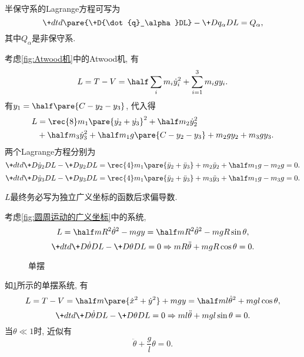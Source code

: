 \documentclass[../LectureNotes.tex]{subfiles}
\begin{document}
\begin{remark}
    半保守系的Lagrange方程可写为
    \[ \+dtd{}\pare{\+D{\dot{q}_\alpha}DL} - \+D{q_\alpha}D{L} = Q_\alpha, \]
    其中$Q_\alpha$是非保守系.
\end{remark}
\begin{sample}
    \begin{ex}
        考虑\cref{fig:Atwood机}中的Atwood机, 有
        \[ L = T-V = \half\sum_i m_i \dot{y}_i^2 + \sum_{i=1}^3 m_i gy_i. \]
        有$\displaystyle y_1 = \half\pare{C - y_2 - y_3}$, 代入得
        \begin{align*}
            L &= \rec{8}m_1\pare{\dot{y_2}+\dot{y_3}}^2 + \half m_2\dot{y}_2^2 \\ &+ \half m_3\dot{y}_3^2 + \half m_1g\pare{C-y_2 - y_3} + m_2 gy_2 + m_3gy_3. 
        \end{align*}
        两个Lagrange方程分别为
        \[ \+dtd{}\+D{\dot{y}_2}DL - \+D{y_2}DL = \rec{4}m_1\pare{\ddot{y}_2 + \ddot{y}_3} + m_2\ddot{y}_2 + \half m_1 g - m_2 g = 0. \]
        \[ \+dtd{}\+D{\dot{y}_3}DL - \+D{y_3}DL = \rec{4}m_1\pare{\ddot{y}_2 + \ddot{y}_3} + m_3\ddot{y}_3 + \half m_1 g - m_3 g = 0. \]
    \end{ex}
\end{sample}
\begin{pitfall}
    $L$最终务必写为独立广义坐标的函数后求偏导数.
\end{pitfall}
\begin{sample}
    \begin{ex}
        考虑\cref{fig:圆周运动的广义坐标}中的系统,
        \[ L = \half mR^2\dot{\theta}^2 - mgy = \half mR^2\dot{\theta}^2 - mgR\sin\theta, \]
        \[ \+dtd{}\+D{\dot{\theta}}DL - \+D{\theta}DL = 0\Rightarrow mR\ddot{\theta} + mgR\cos\theta = 0. \]
    \end{ex}
\end{sample}
\begin{figure}[ht]
    \centering
    \caption{单摆}
    \label{fig:单摆}
\end{figure}
\begin{sample}
    \begin{ex}
        如\cref{fig:单摆}所示的单摆系统, 有
        \[ L = T-V = \half m\pare{\dot{x}^2 + \dot{y}^2} + mgy = \half ml\dot{\theta}^2 + mgl\cos\theta, \]
        \[ \+dtd{}\+D{\dot{\theta}}DL - \+D{\theta}DL = 0\Rightarrow ml\ddot{\theta} + mgl\sin\theta = 0. \]
        当$\theta \ll 1$时, 近似有
        \[ \ddot{\theta} + \frac{g}{l} \theta = 0. \]
    \end{ex}
\end{sample}
\end{document}
